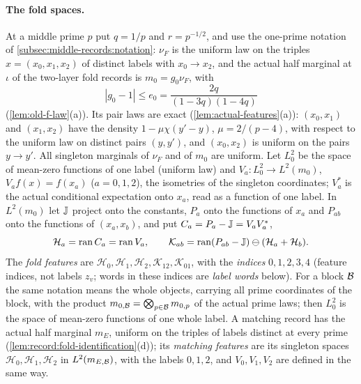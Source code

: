 \paragraph{The fold spaces.}
At a middle prime $p$ put $q=1/p$ and $r=p^{-1/2}$, and use the one-prime
notation of \cref{subsec:middle-records:notation}: $\nu_F$ is the uniform law on
the triples $x=(x_0,x_1,x_2)$ of distinct labels with $x_0\to x_2$, and the
actual half marginal at $\iota$ of the two-layer fold records is
$m_0=g_0\nu_F$, with
\[
 |g_0-1|\le e_0=\frac{2q}{(1-3q)(1-4q)}
\]
(\cref{lem:old-f-law}(a)). Its pair laws are exact (\cref{lem:actual-features}(a)):
$(x_0,x_1)$ and $(x_1,x_2)$ have the density $1-\mu\chi(y'-y)$, $\mu=2/(p-4)$, with
respect to the uniform law on distinct pairs $(y,y')$, and $(x_0,x_2)$ is uniform on
the pairs $y\to y'$. All singleton marginals of $\nu_F$ and of $m_0$ are uniform.
Let $L^2_0$ be the space of mean-zero functions of one label (uniform law) and
$V_a\colon L^2_0\to L^2(m_0)$, $V_af(x)=f(x_a)$ ($a=0,1,2$), the isometries of the
singleton coordinates; $V_a^*$ is the actual conditional expectation onto $x_a$,
read as a function of one label. In $L^2(m_0)$ let $\mathbb J$ project onto the
constants, $P_a$ onto the functions of $x_a$ and $P_{ab}$ onto the functions of
$(x_a,x_b)$, and put $C_a=P_a-\mathbb J=V_aV_a^*$,
\[
 \mathcal H_a=\operatorname{ran}C_a=\operatorname{ran}V_a,\qquad
 \mathcal K_{ab}=\operatorname{ran}(P_{ab}-\mathbb J)\ominus(\mathcal H_a+\mathcal H_b).
\]
The \emph{fold features} are
$\mathcal H_0,\mathcal H_1,\mathcal H_2,\mathcal K_{12},\mathcal K_{01}$,
with the \emph{indices} $0,1,2,3,4$ (feature indices, not labels
$z_v$; words in these indices are \emph{label words} below). For a block $\mathcal B$ the same notation means
the whole objects, carrying all prime coordinates of the block, with the
product $m_{0,\mathcal B}=\bigotimes_{p\in\mathcal B}m_{0,p}$ of the actual prime laws; then
$L^2_0$ is the space of mean-zero functions of one whole label. A
matching record has the actual half marginal $m_E$, uniform on the triples of
labels distinct at every prime (\cref{lem:record:fold-identification}(d)); its
\emph{matching features} are its singleton spaces $\mathcal H_0,\mathcal H_1,\mathcal H_2$
in $L^2(m_{E,\mathcal B})$, with the labels $0,1,2$, and $V_0,V_1,V_2$ are defined in the
same way.

